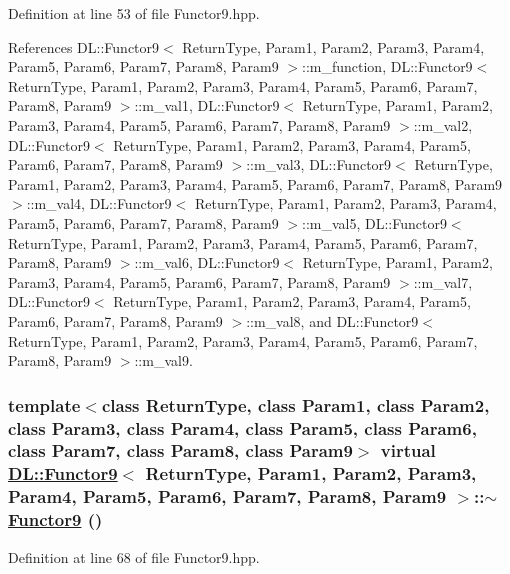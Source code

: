 Definition at line 53 of file Functor9.hpp.

References DL::Functor9$<$ Return\-Type, Param1, Param2, Param3, Param4, Param5, Param6, Param7, Param8, Param9 $>$::m\_\-function, DL::Functor9$<$ Return\-Type, Param1, Param2, Param3, Param4, Param5, Param6, Param7, Param8, Param9 $>$::m\_\-val1, DL::Functor9$<$ Return\-Type, Param1, Param2, Param3, Param4, Param5, Param6, Param7, Param8, Param9 $>$::m\_\-val2, DL::Functor9$<$ Return\-Type, Param1, Param2, Param3, Param4, Param5, Param6, Param7, Param8, Param9 $>$::m\_\-val3, DL::Functor9$<$ Return\-Type, Param1, Param2, Param3, Param4, Param5, Param6, Param7, Param8, Param9 $>$::m\_\-val4, DL::Functor9$<$ Return\-Type, Param1, Param2, Param3, Param4, Param5, Param6, Param7, Param8, Param9 $>$::m\_\-val5, DL::Functor9$<$ Return\-Type, Param1, Param2, Param3, Param4, Param5, Param6, Param7, Param8, Param9 $>$::m\_\-val6, DL::Functor9$<$ Return\-Type, Param1, Param2, Param3, Param4, Param5, Param6, Param7, Param8, Param9 $>$::m\_\-val7, DL::Functor9$<$ Return\-Type, Param1, Param2, Param3, Param4, Param5, Param6, Param7, Param8, Param9 $>$::m\_\-val8, and DL::Functor9$<$ Return\-Type, Param1, Param2, Param3, Param4, Param5, Param6, Param7, Param8, Param9 $>$::m\_\-val9.\hypertarget{classDL_1_1Functor9_a1}{
\subsubsection[$\sim$Functor9]{\setlength{\rightskip}{0pt plus 5cm}template$<$class Return\-Type, class Param1, class Param2, class Param3, class Param4, class Param5, class Param6, class Param7, class Param8, class Param9$>$ virtual \hyperlink{classDL_1_1Functor9}{DL::Functor9}$<$ Return\-Type, Param1, Param2, Param3, Param4, Param5, Param6, Param7, Param8, Param9 $>$::$\sim$\hyperlink{classDL_1_1Functor9}{Functor9} ()}}
\label{classDL_1_1Functor9_a1}




Definition at line 68 of file Functor9.hpp.

